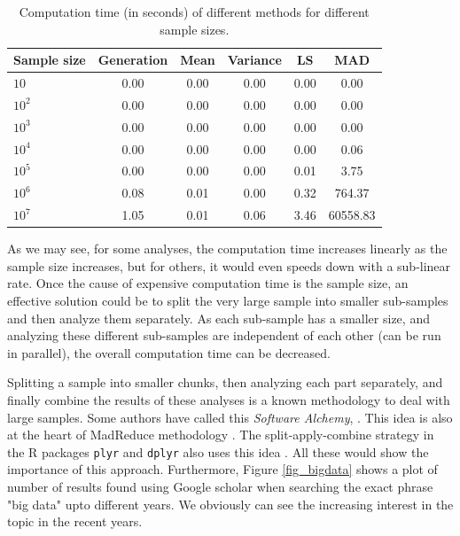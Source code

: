 \documentclass[11pt,a5paper,twoside]{book}
\begin{document}
\begin{table}[ht]
\centering
\begin{tabular}{lccccc}
  \hline
Sample size & Generation & Mean & Variance & LS & MAD \\ 
  \hline
 $10$ & 0.00 & 0.00 & 0.00 & 0.00 & 0.00 \\ 
 $10^2$ & 0.00 & 0.00 & 0.00 & 0.00 & 0.00 \\ 
 $10^3$ & 0.00 & 0.00 & 0.00 & 0.00 & 0.00 \\ 
 $10^4$ & 0.00 & 0.00 & 0.00 & 0.00 & 0.06 \\ 
 $10^5$ & 0.00 & 0.00 & 0.00 & 0.01 & 3.75 \\ 
 $10^6$ & 0.08 & 0.01 & 0.00 & 0.32 & 764.37 \\ 
 $10^7$ & 1.05 & 0.01 & 0.06 & 3.46 & 60558.83 \\ 
   \hline
\end{tabular}
\caption{Computation time (in seconds) of different methods for different sample sizes.} 
\label{tab_comptime1}
\end{table}



As we may see, for some analyses, the computation time increases linearly as the sample size increases, but for others, it would even speeds down with a sub-linear rate. Once the cause of expensive computation time is the sample size, an effective solution could be to split the very large sample into smaller sub-samples and then analyze them separately. As each sub-sample has a smaller size, and analyzing these different sub-samples are independent of each other (can be run in parallel), the overall computation time can be decreased. 

Splitting a sample into smaller chunks, then analyzing each part separately, and finally combine the results of these analyses is a known methodology to deal with large samples. Some authors have called this \emph{Software Alchemy}, \cite{matloff2014}. This idea is also at the heart of MadReduce methodology \citep{dean2008}. The split-apply-combine strategy in the R packages {\tt{plyr}} and {\tt{dplyr}} also uses this idea \citep{wickham2011}. All these would show the importance of this approach. Furthermore, Figure \ref{fig_bigdata} shows a plot of number of results found using Google scholar when searching the exact phrase "big data" upto different years. We obviously can see the increasing interest in the topic in the recent years.
\end{document}
